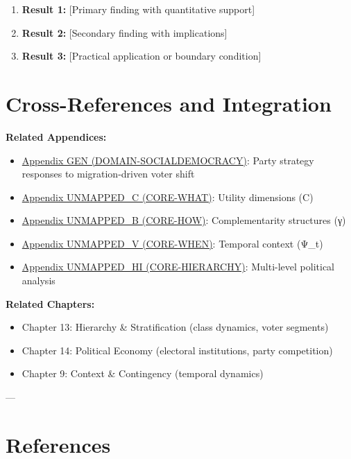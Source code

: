 \begin{enumerate}
    \item \textbf{Result 1:} [Primary finding with quantitative support]
    \item \textbf{Result 2:} [Secondary finding with implications]
    \item \textbf{Result 3:} [Practical application or boundary condition]
\end{enumerate}


\section{Cross-References and Integration}
\label{sec:crossref}

\textbf{Related Appendices:}

\begin{itemize}
\item \hyperref[app:domain-socialdemocracy]{Appendix GEN (DOMAIN-SOCIALDEMOCRACY)}: Party strategy responses to migration-driven voter shift
\item \hyperref[app:core-what]{Appendix UNMAPPED_C (CORE-WHAT)}: Utility dimensions (C)
\item \hyperref[app:core-how]{Appendix UNMAPPED_B (CORE-HOW)}: Complementarity structures (γ)
\item \hyperref[app:core-when]{Appendix UNMAPPED_V (CORE-WHEN)}: Temporal context (Ψ_t)
\item \hyperref[app:core-hierarchy]{Appendix UNMAPPED_HI (CORE-HIERARCHY)}: Multi-level political analysis
\end{itemize}

\textbf{Related Chapters:}

\begin{itemize}
\item Chapter 13: Hierarchy \& Stratification (class dynamics, voter segments)
\item Chapter 14: Political Economy (electoral institutions, party competition)
\item Chapter 9: Context \& Contingency (temporal dynamics)
\end{itemize}

---

\clearpage


\section{References}
\label{sec:references}

